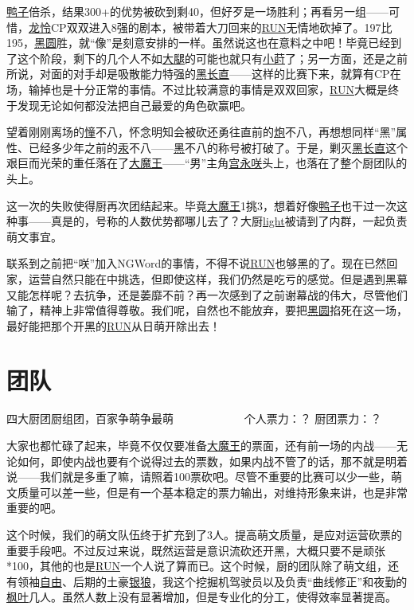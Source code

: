 \uline{鸭子}倍杀，结果300+的优势被砍到剩40，但好歹是一场胜利；再看另一组——可惜，\uline{龙}\uline{怜}CP双双进入8强的剧本，被带着大刀回来的\uline{RUN}无情地砍掉了。197比195，\uline{黑圆}胜，就“像”是刻意安排的一样。虽然说这也在意料之中吧！毕竟已经到了这个阶段，剩下的几个人不如\uline{大腿}的可能也就只有\uline{小莳}了；另一方面，还是之前所说，对面的对手却是吸散能力特强的\uline{黑长直}——这样的比赛下来，就算有CP在场，输掉也是十分正常的事情。不过比较满意的事情是双双回家，\uline{RUN}大概是终于发现无论如何都没法把自己最爱的角色砍赢吧。

望着刚刚离场的\uline{憧}不八，怀念明知会被砍还勇往直前的\uline{炮}不八，再想想同样“黑”属性、已经多少年之前的\uline{汞}不八——\uline{黑}不八的称号被打破了。于是，剿灭\uline{黑长直}这个艰巨而光荣的重任落在了\uline{大魔王}——“男”主角\uline{宫永咲}头上，也落在了整个厨团队的头上。

这一次的失败使得厨再次团结起来。毕竟\uline{大魔王}1挑3，想着好像\uline{鸭子}也干过一次这种事——真是的，号称的人数优势都哪儿去了？大厨\uline{light}被请到了内群，一起负责萌文事宜。

联系到之前把“咲”加入NGWord的事情，不得不说\uline{RUN}也够黑的了。现在已然回家，运营自然只能在中挑选，但即使这样，我们仍然是吃亏的感觉。但是遇到黑幕又能怎样呢？去抗争，还是萎靡不前？再一次感到了之前谢幕战的伟大，尽管他们输了，精神上非常值得尊敬。我们呢，自然也不能放弃，要把\uline{黑圆}掐死在这一场，最好能把那个开黑的\uline{RUN}从日萌开除出去！

\chapter{团队}
\begin{center}
{\subTitle 四大厨团厨组团，百家争萌争最萌}
\subMemo
　　　　　　个人票力：？ 厨团票力：？
\end{center}

大家也都忙碌了起来，毕竟不仅仅要准备\uline{大魔王}的票面，还有前一场的内战——无论如何，即使内战也要有个说得过去的票数，如果内战不管了的话，那不就是明着说——我们就是多重了嘛，请照着100票砍吧。尽管不重要的比赛可以少一些，萌文质量可以差一些，但是有一个基本稳定的票力输出，对维持形象来讲，也是非常重要的吧。

这个时候，我们的萌文队伍终于扩充到了3人。提高萌文质量，是应对运营砍票的重要手段吧。不过反过来说，既然运营是意识流砍还开黑，大概只要不是顽张*100，其他的也是\uline{RUN}一个人说了算而已。这个时候，厨的团队除了萌文组，还有领袖\uline{自由}、后期的土豪\uline{银狼}，我这个挖掘机驾驶员以及负责“曲线修正”和夜勤的\uline{枫叶}几人。虽然人数上没有显著增加，但是专业化的分工，使得效率显著提高。

